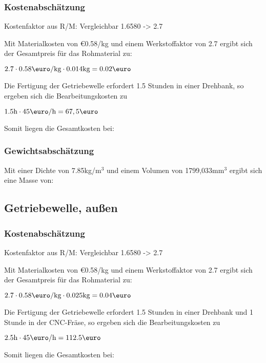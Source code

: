 \documentclass[10pt, a4paper]{article}
\begin{document}
\subsubsection{Kostenabschätzung}
\begin{center}
  Kostenfaktor aus R/M: Vergleichbar 1.6580 -> 2.7 \\
\end{center}
Mit Materialkosten von \euro0.58/kg und einem Werkstoffaktor von 2.7 ergibt sich der Gesamtpreis für das Rohmaterial zu: 
\begin{center}
    $2.7 \cdot 0.58\text{\euro/kg} \cdot 0.014\text{kg} = 0.02\text{\euro}$
\end{center}
Die Fertigung der Getriebewelle erfordert 1.5 Stunden in einer Drehbank, so ergeben sich die Bearbeitungskosten zu 
\begin{center}
  $1.5\text{h} \cdot 45\text{\euro/h} = 67,5\text{\euro}$
\end{center}
Somit liegen die Gesamtkosten bei:
\begin{flushright}
\end{flushright}
\subsubsection{Gewichtsabschätzung}
Mit einer Dichte von 7.85kg/m$^3$ und einem Volumen von 1799,033mm$^3$ ergibt sich eine Masse von:
\begin{flushright}
\end{flushright}

\newpage
\subsection{Getriebewelle, außen}
\begin{figure}[h]
  \centering
  \vspace{-10pt}
\end{figure}
\subsubsection{Kostenabschätzung}
\begin{center}
  Kostenfaktor aus R/M: Vergleichbar 1.6580 -> 2.7 \\
\end{center}
Mit Materialkosten von \euro0.58/kg und einem Werkstoffaktor von 2.7 ergibt sich der Gesamtpreis für das Rohmaterial zu: 
\begin{center}
    $2.7 \cdot 0.58\text{\euro/kg} \cdot 0.025\text{kg} = 0.04\text{\euro}$
\end{center}
Die Fertigung der Getriebewelle erfordert 1.5 Stunden in einer Drehbank und 1 Stunde in der CNC-Fräse, so ergeben sich die Bearbeitungskosten zu 
\begin{center}
  $2.5\text{h} \cdot 45\text{\euro/h} = 112.5\text{\euro}$
\end{center}
Somit liegen die Gesamtkosten bei:
\begin{flushright}
\end{flushright}
\end{document}
